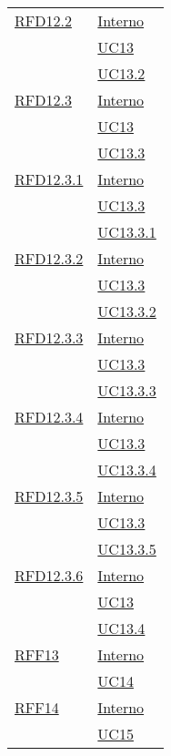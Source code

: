 \begin{longtable}{|>{\centering}m{5cm}|m{5cm}<{\centering}|}
\hyperlink{RFD12.2}{RFD12.2} & \hyperlink{Interno}{Interno}\\
& \hyperref[UC13]{UC13}\\
& \hyperref[UC13.2]{UC13.2}\\ \hline

\hyperlink{RFD12.3}{RFD12.3} & \hyperlink{Interno}{Interno}\\
& \hyperref[UC13]{UC13}\\
& \hyperref[UC13.3]{UC13.3}\\ \hline

\hyperlink{RFD12.3.1}{RFD12.3.1} & \hyperlink{Interno}{Interno}\\
& \hyperref[UC13.3]{UC13.3}\\
& \hyperref[UC13.3.1]{UC13.3.1}\\ \hline

\hyperlink{RFD12.3.2}{RFD12.3.2} & \hyperlink{Interno}{Interno}\\
& \hyperref[UC13.3]{UC13.3}\\
& \hyperref[UC13.3.2]{UC13.3.2}\\ \hline

\hyperlink{RFD12.3.3}{RFD12.3.3} & \hyperlink{Interno}{Interno}\\
& \hyperref[UC13.3]{UC13.3}\\
& \hyperref[UC13.3.3]{UC13.3.3}\\ \hline

\hyperlink{RFD12.3.4}{RFD12.3.4} & \hyperlink{Interno}{Interno}\\
& \hyperref[UC13.3]{UC13.3}\\
& \hyperref[UC13.3.4]{UC13.3.4}\\ \hline

\hyperlink{RFD12.3.5}{RFD12.3.5} & \hyperlink{Interno}{Interno}\\
& \hyperref[UC13.3]{UC13.3}\\
& \hyperref[UC13.3.5]{UC13.3.5}\\ \hline

\hyperlink{RFD12.3.6}{RFD12.3.6} & \hyperlink{Interno}{Interno}\\
& \hyperref[UC13]{UC13}\\
& \hyperref[UC13.4]{UC13.4}\\ \hline

\hyperlink{RFF13}{RFF13} & \hyperlink{Interno}{Interno}\\
& \hyperref[UC14]{UC14}\\ \hline

\hyperlink{RFF14}{RFF14} & \hyperlink{Interno}{Interno}\\
& \hyperref[UC15]{UC15}\\ \hline


\end{longtable}
